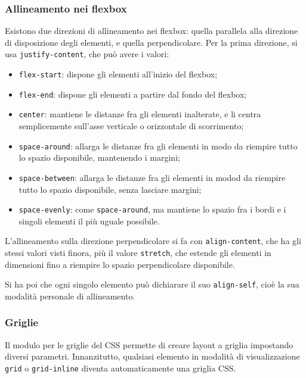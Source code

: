 \documentclass[a4paper,11pt]{article}
\begin{document}
\subsubsection{Allineamento nei flexbox}
Esistono due direzioni di allineamento nei flexbox: quella parallela alla direzione di disposizione degli elementi, e quella perpendicolare.
Per la prima direzione, si usa \lstinline|justify-content|, che può avere i valori:
\begin{itemize}
	\item \lstinline|flex-start|: dispone gli elementi all'inizio del flexbox;
	\item \lstinline|flex-end|: dispone gli elementi a partire dal fondo del flexbox; 
	\item \lstinline|center|: mantiene le distanze fra gli elementi inalterate, e li centra semplicemente sull'asse verticale o orizzontale di scorrimento;
	\item \lstinline|space-around|: allarga le distanze fra gli elementi in modo da riempire tutto lo spazio disponibile, mantenendo i margini;
	\item \lstinline|space-between|: allarga le distanze fra gli elementi in modod da riempire tutto lo spazio disponibile, senza lasciare margini;
	\item \lstinline|space-evenly|: come \lstinline|space-around|, ma mantiene lo spazio fra i bordi e i singoli elementi il più uguale possibile.
\end{itemize}

L'allineamento sulla direzione perpendicolare si fa con \lstinline|align-content|, che ha gli stessi valori visti finora, più il valore \lstinline|stretch|, che estende gli elementi in dimensioni fino a riempire lo spazio perpendicolare disponibile.

Si ha poi che ogni singolo elemento può dichiarare il suo \lstinline|align-self|, cioè la sua modalità personale di allineamento.

\subsubsection{Griglie}
Il modulo per le griglie del CSS permette di creare layout a griglia impostando diversi parametri.
Innanzitutto, qualsiasi elemento in modalità di visualizzazione \lstinline|grid| o \lstinline|grid-inline| diventa automaticamente una griglia CSS.
\end{document}
